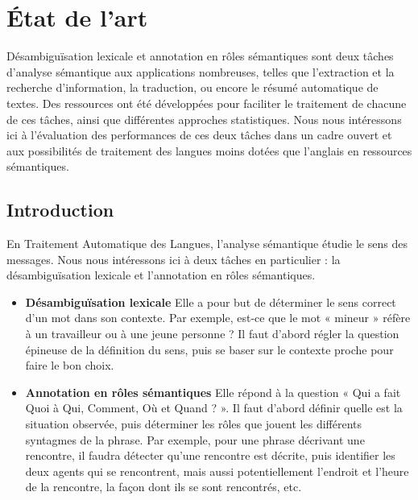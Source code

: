 \chapter{État de l'art} 
\label{ch:etatdelart} 

Désambiguïsation lexicale et annotation en rôles sémantiques sont deux tâches
d'analyse sémantique aux applications nombreuses, telles que l'extraction et la
recherche d'information, la traduction, ou encore le résumé automatique de
textes. Des ressources ont été développées pour faciliter le traitement de
chacune de ces tâches, ainsi que différentes approches statistiques. Nous nous
intéressons ici à l'évaluation des performances de ces deux tâches dans un
cadre ouvert et aux possibilités de traitement des langues moins dotées que
l'anglais en ressources sémantiques.


\section{Introduction}

En Traitement Automatique des Langues, l'analyse sémantique étudie le sens des
messages. Nous nous intéressons ici à deux tâches en particulier : la
désambiguïsation lexicale et l'annotation en rôles sémantiques.

\begin{itemize}

  \item \textbf{Désambiguïsation lexicale} Elle a pour but de déterminer le
      sens correct d'un mot dans son contexte. Par exemple, est-ce que le mot «
      mineur » réfère à un travailleur ou à une jeune personne ? Il faut
      d'abord régler la question épineuse de la définition du sens, puis se
      baser sur le contexte proche pour faire le bon choix.

  \item \textbf{Annotation en rôles sémantiques} Elle répond à la question «
      Qui a fait Quoi à Qui, Comment, Où et Quand ? ». Il faut d'abord définir
      quelle est la situation observée, puis déterminer les rôles que jouent
      les différents syntagmes de la phrase. Par exemple, pour une phrase
      décrivant une rencontre, il faudra détecter qu'une rencontre est décrite,
      puis identifier les deux agents qui se rencontrent, mais aussi
      potentiellement l'endroit et l'heure de la rencontre, la façon dont ils
      se sont rencontrés, etc.

\end{itemize}

